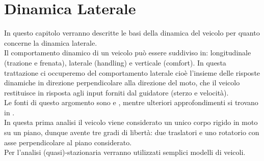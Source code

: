 \section{Dinamica Laterale}
In questo capitolo verranno descritte le basi della dinamica del veicolo per quanto concerne la dinamica laterale.\\
Il comportamento dinamico di un veicolo può essere suddiviso in: longitudinale (trazione
e frenata), laterale (handling) e verticale (comfort).
In questa trattazione ci occuperemo del comportamento laterale cioè l'insieme delle risposte dinamiche in direzione perpendicolare alla direzione del moto, che il veicolo restituisce in risposta agli input forniti dal guidatore (sterzo e velocità).\\
Le fonti di questo argomento sono \cite{Guiggiani} e \cite{limebeer2018dynamics}, mentre ulteriori approfondimenti si trovano in  \cite{pacejka2005tire}.\\



In questa prima analisi il veicolo viene considerato un unico corpo rigido in
moto su un piano, dunque avente tre gradi di libertà: due traslatori e uno
rotatorio con asse perpendicolare al piano considerato.\\ 
Per l'analisi (quasi)-stazionaria verranno utilizzati semplici modelli di veicoli. 


